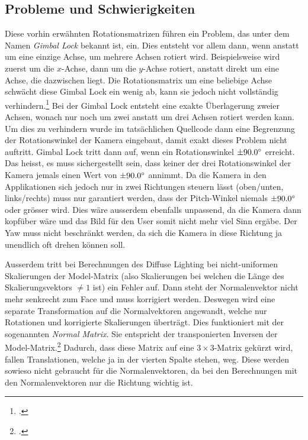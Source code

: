 \documentclass[titlepage, 11pt, a4paper, ngerman]{article}
\begin{document}
\subsection{Probleme und Schwierigkeiten}
Diese vorhin erwähnten Rotationsmatrizen führen ein Problem, das unter dem Namen \textit{Gimbal Lock} bekannt ist, ein. Dies entsteht vor allem dann, wenn anstatt um eine einzige Achse, um mehrere Achsen rotiert wird. Beispielsweise wird zuerst um die $x$-Achse, dann um die $y$-Achse rotiert, anstatt direkt um eine Achse, die dazwischen liegt. Die Rotationsmatrix um eine beliebige Achse schwächt diese Gimbal Lock ein wenig ab, kann sie jedoch nicht vollständig verhindern.\footcite{transformations} Bei der Gimbal Lock entsteht eine exakte Überlagerung zweier Achsen, wonach nur noch um zwei anstatt um drei Achsen rotiert werden kann. Um dies zu verhindern wurde im tatsächlichen Quellcode dann eine Begrenzung der Rotationswinkel der Kamera eingebaut, damit exakt dieses Problem nicht auftritt. Gimbal Lock tritt dann auf, wenn ein Rotationswinkel $\pm 90.0\degree$ erreicht. Das heisst, es muss sichergestellt sein, dass keiner der drei Rotationswinkel der Kamera jemals einen Wert von $\pm 90.0\degree$ annimmt. Da die Kamera in den Applikationen sich jedoch nur in zwei Richtungen steuern lässt (oben/unten, links/rechts) muss nur garantiert werden, dass der Pitch-Winkel niemals $\pm 90.0\degree$ oder grösser wird. Dies wäre ausserdem ebenfalls unpassend, da die Kamera dann kopfüber wäre und das Bild für den User somit nicht mehr viel Sinn ergäbe. Der Yaw muss nicht beschränkt werden, da sich die Kamera in diese Richtung ja unendlich oft drehen können soll.\par
Ausserdem tritt bei Berechnungen des Diffuse Lighting bei nicht-uniformen Skalierungen der Model-Matrix (also Skalierungen bei welchen die Länge des Skalierungsvektors $\neq 1$ ist) ein Fehler auf. Dann steht der Normalenvektor nicht mehr senkrecht zum \gls{Face} und muss korrigiert werden. Deswegen wird eine separate Transformation auf die Normalvektoren angewandt, welche nur Rotationen und korrigierte Skalierungen überträgt. Dies funktioniert mit der sogenannten \textit{Normal Matrix}. Sie entspricht der transponierten Inversen der Model-Matrix.\footcite{logl-lighting} Dadurch, dass diese Matrix auf eine $3 \times 3$-Matrix gekürzt wird, fallen Translationen, welche ja in der vierten Spalte stehen, weg. Diese werden sowieso nicht gebraucht für die Normalenvektoren, da bei den Berechnungen mit den Normalenvektoren nur die Richtung wichtig ist.
\end{document}

